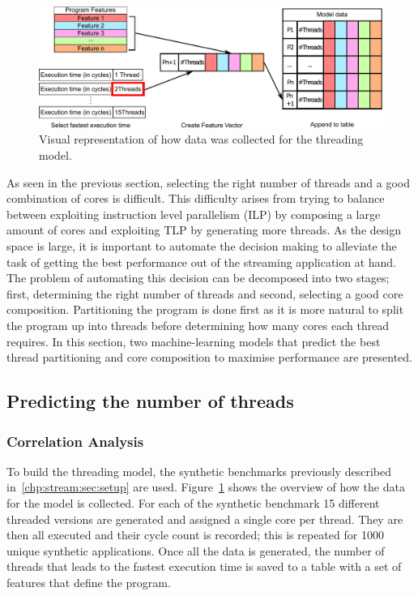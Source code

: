 
\begin{figure}[t]
  \centering
 \includegraphics[width=1\textwidth]{streamit-paper/graphics/thread_expl.pdf}
  \caption{Visual representation of how data was collected for the threading model.}\label{fig:thread_expl}
\end{figure}
As seen in the previous section, selecting the right number of threads and a good combination of cores is difficult.
This difficulty arises from trying to balance between exploiting instruction level parallelism (ILP) by composing a large amount of cores and exploiting TLP by generating more threads.
As the design space is large, it is important to automate the decision making to alleviate the task of getting the best performance out of the streaming application at hand.
The problem of automating this decision can be decomposed into two stages; first, determining the right number of threads and second, selecting a good core composition.
Partitioning the program is done first as it is more natural to split the program up into threads before determining how many cores each thread requires.
In this section, two machine-learning models that predict the best thread partitioning and core composition to maximise performance are presented.

\subsection{Predicting the number of threads}
\subsubsection{Correlation Analysis}

To build the threading model, the synthetic benchmarks previously described in~\ref{chp:stream:sec:setup} are used.
Figure~\ref{fig:thread_expl} shows the overview of how the data for the model is collected.
For each of the synthetic benchmark 15 different threaded versions are generated and assigned a single core per thread.
They are then all executed and their cycle count is recorded; this is repeated for 1000 unique synthetic applications. 
Once all the data is generated, the number of threads that leads to the fastest execution time is saved to a table with a set of features that define the program.

